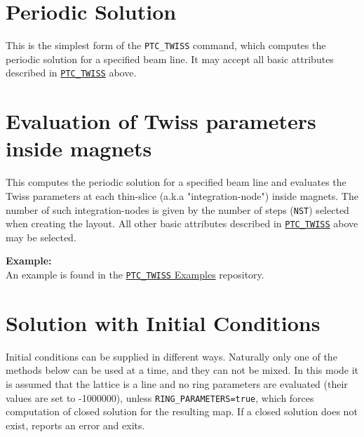 \begin{madlist}
   
\end{madlist}


\section{Periodic Solution}
\label{sec:ptc-twiss-periodic}	

This is the simplest form of the \texttt{PTC\_TWISS} command, which
computes the periodic solution for a specified beam line. It may
accept all basic attributes described in
\hyperref[sec:ptc-twiss]{\texttt{PTC\_TWISS}} above. 



\section{Evaluation of Twiss parameters inside magnets}
\label{sec:ptc-twiss-slicing}

This computes the periodic solution for a specified beam
line and evaluates the Twiss parameters at each thin-slice
(a.k.a "integration-node") inside magnets. The number of such
integration-nodes is given by the number of steps (\texttt{NST})
selected when creating the \ptc layout. All other basic
attributes described in \hyperref[sec:ptc-twiss]{\texttt{PTC\_TWISS}}
above may be selected.



\textbf{Example:} \\
An example is found in the
\href{http://madx.web.cern.ch/madx/madX/examples/ptc_twiss/SliceMagnets/}
{\texttt{PTC\_TWISS} Examples} repository. 



\section{Solution with Initial Conditions}
\label{sec:ptc-twiss-sol-initial-cond}


Initial conditions can be supplied in different ways.  Naturally only
one of the methods below can be used at a time, and they can not be
mixed.  In this mode it is assumed that the lattice is a line and no
ring parameters are evaluated (their values are set to -1000000), unless
\texttt{RING\_PARAMETERS=true}, which forces computation of closed solution
for the resulting map. If a closed solution does not exist, \ptc
reports an error and exits.

